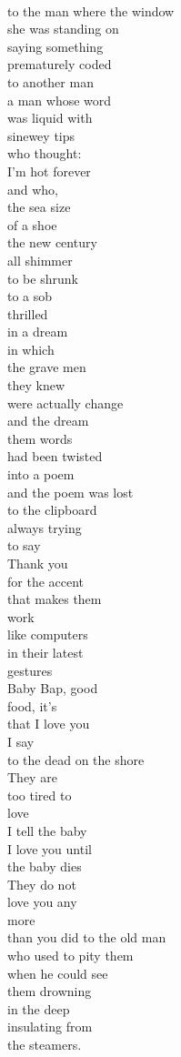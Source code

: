 \documentclass[smalldemyvopaper,11pt,twoside,onecolumn,openright,extrafontsizes]{memoir}
\begin{document}
\\to the man where the window
\\she was standing on
\\saying something
\\prematurely coded
\\to another man
\\a man whose word
\\was liquid with
\\sinewey tips
\\who thought:
\\I'm hot forever
\\and who,
\\the sea size
\\of a shoe
\\the new century
\\all shimmer
\\to be shrunk
\\to a sob
\\thrilled
\\in a dream
\\in which
\\the grave men
\\they knew
\\were actually change
\\and the dream
\\them words
\\had been twisted
\\into a poem
\\and the poem was lost
\\to the clipboard
\\always trying
\\to say
\\Thank you
\\for the accent
\\that makes them
\\work
\\like computers
\\in their latest
\\gestures
\\Baby Bap, good
\\food, it's
\\that I love you
\\I say
\\to the dead on the shore
\\They are
\\too tired to
\\love
\\I tell the baby
\\I love you until
\\the baby dies
\\They do not
\\love you any
\\more
\\than you did to the old man
\\who used to pity them
\\when he could see
\\them drowning
\\in the deep
\\insulating from
\\the steamers.
\end{document}
